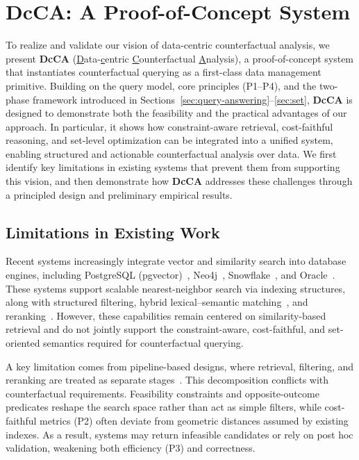 
\section{DcCA: A Proof-of-Concept System}
\label{sec:systems}

To realize and validate our vision of data-centric counterfactual analysis, we present \textbf{DcCA} (\underline{D}ata-\underline{c}entric \underline{C}ounterfactual \underline{A}nalysis), a proof-of-concept system that instantiates counterfactual querying as a first-class data management primitive. Building on the query model, core principles (P1--P4), and the two-phase framework introduced in Sections~\ref{sec:query-answering}--\ref{sec:set}, \textbf{DcCA} is designed to demonstrate both the feasibility and the practical advantages of our approach. In particular, it shows how constraint-aware retrieval, cost-faithful reasoning, and set-level optimization can be integrated into a unified system, enabling structured and actionable counterfactual analysis over data. We first identify key limitations in existing systems that prevent them from supporting this vision, and then demonstrate how \textbf{DcCA} addresses these challenges through a principled design and preliminary empirical results.

\subsection{Limitations in Existing Work}

Recent systems increasingly integrate vector and similarity search into database engines, including PostgreSQL (pgvector)~\cite{pgvector}, Neo4j~\cite{neo4jVector}, Snowflake~\cite{snowflakeCortex}, and Oracle~\cite{oracleHybridIndex,oracleSearch}. These systems support scalable nearest-neighbor search via indexing structures, along with structured filtering, hybrid lexical--semantic matching~\cite{yates2021pretrained,guu2020retrieval}, and reranking~\cite{khattab2020colbert}. However, these capabilities remain centered on similarity-based retrieval and do not jointly support the constraint-aware, cost-faithful, and set-oriented semantics required for counterfactual querying.

A key limitation comes from pipeline-based designs, where retrieval, filtering, and reranking are treated as separate stages~\cite{croft2010search,miutra2018introduction}. This decomposition conflicts with counterfactual requirements. Feasibility constraints and opposite-outcome predicates reshape the search space rather than act as simple filters, while cost-faithful metrics (P2) often deviate from geometric distances assumed by existing indexes. As a result, systems may return infeasible candidates or rely on post hoc validation, weakening both efficiency (P3) and correctness.

